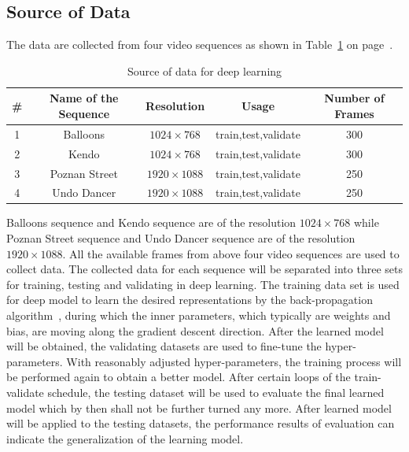 \subsection{Source of Data}\label{subsec:source-of-data}
The data are collected from four video sequences as shown in
Table~\ref{tab:data-source}
on page~\pageref{tab:data-source}.
\begin{table}[!htbp]
    \caption{Source of data for deep learning}
    \bigskip\label{tab:data-source}
    \centering
    \begin{tabular}{c c c c c}
        \toprule
        \# & Name of the Sequence & Resolution & Usage & Number of Frames\\
        \midrule
        1 & Balloons & \(1024\times768\) & train,test,validate & 300\\
        2 & Kendo & \(1024\times768\) & train,test,validate & 300\\
        3 & Poznan Street & \(1920\times1088\) & train,test,validate & 250\\
        4 & Undo Dancer & \(1920\times1088\) & train,test,validate & 250\\
        \bottomrule
    \end{tabular}
\end{table}
Balloons sequence and Kendo sequence are of the resolution \(1024\times768\)
while Poznan Street sequence and Undo Dancer sequence are 
of the resolution \(1920\times1088\).
All the available frames from above four video sequences 
are used to collect data.
The collected data for each sequence will be separated into three sets
for training, testing and validating in deep learning.
The training data set is used for deep model to learn the desired
representations by the back-propagation algorithm~\parencite{RN204},
during which the inner parameters, which typically are 
weights and bias, are moving
along the gradient descent direction.
After the learned model will be obtained, the validating datasets are used to
fine-tune the hyper-parameters.
With reasonably adjusted hyper-parameters, the training process will be
performed again to obtain a better model.
After certain loops of the train-validate schedule, the testing dataset will
be used to evaluate the final learned model which by then
shall not be further turned any more.
After learned model will be applied to the testing datasets, the performance
results of evaluation can indicate the generalization of the learning model.

